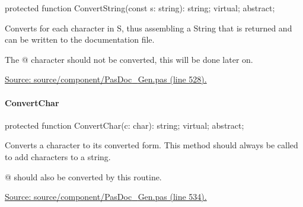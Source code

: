 \documentclass{report}
\newif\ifpdf
\begin{document}
\label{PasDoc_Gen.TDocGenerator-ConvertString}
\begin{list}{}{
\setlength{\itemindent}{0cm}
\setlength{\listparindent}{0cm}
\setlength{\leftmargin}{\evensidemargin}
\addtolength{\leftmargin}{\tmplength}
\settowidth{\labelsep}{X}
\addtolength{\leftmargin}{\labelsep}
\setlength{\labelwidth}{\tmplength}
}
\item[\textbf{Declaration}\hfill]
\ifpdf
\begin{flushleft}
\fi
\begin{ttfamily}
protected function ConvertString(const s: string): string; virtual; abstract;\end{ttfamily}

\ifpdf
\end{flushleft}
\fi

\par
\item[\textbf{Description}]
Converts for each character in S, thus assembling a String that is returned and can be written to the documentation file.

The @ character should not be converted, this will be done later on.\par
\href{https://github.com/pasdoc/pasdoc/blob/master/source/component/PasDoc_Gen.pas#L528}{Source: source/component/PasDoc{\_}Gen.pas (line 528).}

\end{list}
\paragraph*{ConvertChar}\hspace*{\fill}

\label{PasDoc_Gen.TDocGenerator-ConvertChar}
\begin{list}{}{
\setlength{\itemindent}{0cm}
\setlength{\listparindent}{0cm}
\setlength{\leftmargin}{\evensidemargin}
\addtolength{\leftmargin}{\tmplength}
\settowidth{\labelsep}{X}
\addtolength{\leftmargin}{\labelsep}
\setlength{\labelwidth}{\tmplength}
}
\item[\textbf{Declaration}\hfill]
\ifpdf
\begin{flushleft}
\fi
\begin{ttfamily}
protected function ConvertChar(c: char): string; virtual; abstract;\end{ttfamily}

\ifpdf
\end{flushleft}
\fi

\par
\item[\textbf{Description}]
Converts a character to its converted form. This method should always be called to add characters to a string.

@ should also be converted by this routine.\par
\href{https://github.com/pasdoc/pasdoc/blob/master/source/component/PasDoc_Gen.pas#L534}{Source: source/component/PasDoc{\_}Gen.pas (line 534).}

\end{list}
\end{document}
